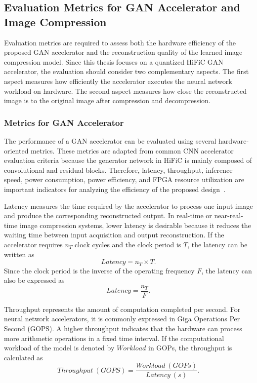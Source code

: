 \subsection{Evaluation Metrics for GAN Accelerator and Image Compression}

Evaluation metrics are required to assess both the hardware efficiency of the proposed GAN accelerator and the reconstruction quality of the learned image compression model. Since this thesis focuses on a quantized HiFiC GAN accelerator, the evaluation should consider two complementary aspects. The first aspect measures how efficiently the accelerator executes the neural network workload on hardware. The second aspect measures how close the reconstructed image is to the original image after compression and decompression.

\subsubsection{Metrics for GAN Accelerator}

The performance of a GAN accelerator can be evaluated using several hardware-oriented metrics. These metrics are adapted from common CNN accelerator evaluation criteria because the generator network in HiFiC is mainly composed of convolutional and residual blocks. Therefore, latency, throughput, inference speed, power consumption, power efficiency, and FPGA resource utilization are important indicators for analyzing the efficiency of the proposed design~\cite{sze2017efficient}.

Latency measures the time required by the accelerator to process one input image and produce the corresponding reconstructed output. In real-time or near-real-time image compression systems, lower latency is desirable because it reduces the waiting time between input acquisition and output reconstruction. If the accelerator requires $n_T$ clock cycles and the clock period is $T$, the latency can be written as
\begin{equation}
Latency = n_T \times T.
\end{equation}
Since the clock period is the inverse of the operating frequency $F$, the latency can also be expressed as
\begin{equation}
Latency = \frac{n_T}{F}.
\end{equation}

Throughput represents the amount of computation completed per second. For neural network accelerators, it is commonly expressed in Giga Operations Per Second (GOPS). A higher throughput indicates that the hardware can process more arithmetic operations in a fixed time interval. If the computational workload of the model is denoted by $Workload$ in GOPs, the throughput is calculated as
\begin{equation}
Throughput~(GOPS) = \frac{Workload~(GOPs)}{Latency~(s)}.
\end{equation}

